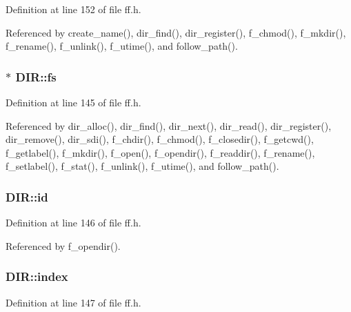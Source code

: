 Definition at line 152 of file ff.\-h.



Referenced by create\-\_\-name(), dir\-\_\-find(), dir\-\_\-register(), f\-\_\-chmod(), f\-\_\-mkdir(), f\-\_\-rename(), f\-\_\-unlink(), f\-\_\-utime(), and follow\-\_\-path().

\hypertarget{structDIR_a312eaa66cb703fb2993ea98173dc0c9a}{
\subsubsection[{fs}]{$\ast$ D\-I\-R\-::fs}}\label{structDIR_a312eaa66cb703fb2993ea98173dc0c9a}


Definition at line 145 of file ff.\-h.



Referenced by dir\-\_\-alloc(), dir\-\_\-find(), dir\-\_\-next(), dir\-\_\-read(), dir\-\_\-register(), dir\-\_\-remove(), dir\-\_\-sdi(), f\-\_\-chdir(), f\-\_\-chmod(), f\-\_\-closedir(), f\-\_\-getcwd(), f\-\_\-getlabel(), f\-\_\-mkdir(), f\-\_\-open(), f\-\_\-opendir(), f\-\_\-readdir(), f\-\_\-rename(), f\-\_\-setlabel(), f\-\_\-stat(), f\-\_\-unlink(), f\-\_\-utime(), and follow\-\_\-path().

\hypertarget{structDIR_aca2c95a99a04173917ec70c030891383}{
\subsubsection[{id}]{ D\-I\-R\-::id}}\label{structDIR_aca2c95a99a04173917ec70c030891383}


Definition at line 146 of file ff.\-h.



Referenced by f\-\_\-opendir().

\hypertarget{structDIR_ab95119fbacbe45e3e9ee0f962b844092}{
\subsubsection[{index}]{ D\-I\-R\-::index}}\label{structDIR_ab95119fbacbe45e3e9ee0f962b844092}


Definition at line 147 of file ff.\-h.



